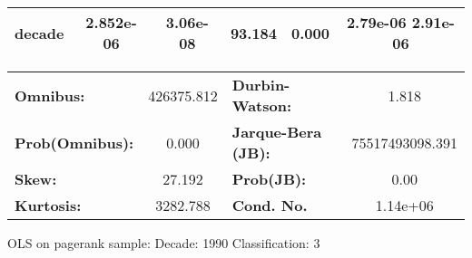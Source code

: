 \begin{center}
\begin{tabular}{lccccc}
\textbf{decade}             &    2.852e-06  &     3.06e-08     &    93.184  &         0.000        &      2.79e-06  2.91e-06       \\
\bottomrule
\end{tabular}
\begin{tabular}{lclc}
\textbf{Omnibus:}       & 426375.812 & \textbf{  Durbin-Watson:     } &        1.818     \\
\textbf{Prob(Omnibus):} &    0.000   & \textbf{  Jarque-Bera (JB):  } & 75517493098.391  \\
\textbf{Skew:}          &   27.192   & \textbf{  Prob(JB):          } &         0.00     \\
\textbf{Kurtosis:}      &  3282.788  & \textbf{  Cond. No.          } &     1.14e+06     \\
\bottomrule
\end{tabular}
\end{center}
\break
OLS on pagerank sample: Decade: 1990 Classification: 3

